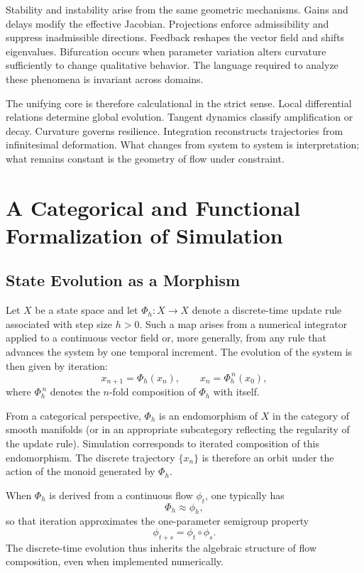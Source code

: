 \documentclass[12pt]{book}
\begin{document}
Stability and instability arise from the same geometric mechanisms. Gains and delays modify the effective Jacobian. Projections enforce admissibility and suppress inadmissible directions. Feedback reshapes the vector field and shifts eigenvalues. Bifurcation occurs when parameter variation alters curvature sufficiently to change qualitative behavior. The language required to analyze these phenomena is invariant across domains.

The unifying core is therefore calculational in the strict sense. Local differential relations determine global evolution. Tangent dynamics classify amplification or decay. Curvature governs resilience. Integration reconstructs trajectories from infinitesimal deformation. What changes from system to system is interpretation; what remains constant is the geometry of flow under constraint.

\chapter{A Categorical and Functional Formalization of Simulation}

\section{State Evolution as a Morphism}

Let $X$ be a state space and let $\Phi_h : X \to X$ denote a discrete-time
update rule associated with step size $h > 0$. Such a map arises from a
numerical integrator applied to a continuous vector field or, more generally,
from any rule that advances the system by one temporal increment. The
evolution of the system is then given by iteration:
\[
x_{n+1} = \Phi_h(x_n),
\qquad
x_n = \Phi_h^{\,n}(x_0),
\]
where $\Phi_h^{\,n}$ denotes the $n$-fold composition of $\Phi_h$ with itself.

From a categorical perspective, $\Phi_h$ is an endomorphism of $X$ in the
category of smooth manifolds (or in an appropriate subcategory reflecting the
regularity of the update rule). Simulation corresponds to iterated composition
of this endomorphism. The discrete trajectory $\{x_n\}$ is therefore an orbit
under the action of the monoid generated by $\Phi_h$.

When $\Phi_h$ is derived from a continuous flow $\phi_t$, one typically has
\[
\Phi_h \approx \phi_h,
\]
so that iteration approximates the one-parameter semigroup property
\[
\phi_{t+s} = \phi_t \circ \phi_s.
\]
The discrete-time evolution thus inherits the algebraic structure of flow
composition, even when implemented numerically.
\end{document}
